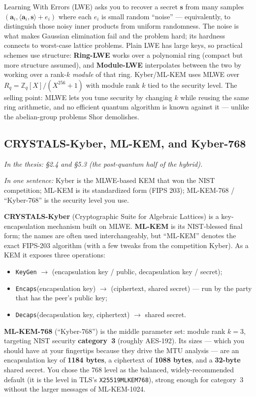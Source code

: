 \documentclass[11pt]{article}
\newcommand{\seethesis}[1]{%
  {\small\color{softgray}\textit{In the thesis: #1}}\par\vspace{3pt}}
\newcommand{\nutshell}[1]{\noindent\textit{In one sentence:} #1\par\vspace{4pt}}
\begin{document}
Learning With Errors (LWE) asks you to recover a secret $\mathbf{s}$ from many
samples $(\mathbf{a}_i, \langle \mathbf{a}_i, \mathbf{s}\rangle + e_i)$ where each
$e_i$ is small random ``noise'' --- equivalently, to distinguish those noisy
inner products from uniform randomness. The noise is what makes Gaussian
elimination fail and the problem hard; its hardness connects to worst-case
lattice problems. Plain LWE has large keys, so practical schemes use structure:
\textbf{Ring-LWE} works over a polynomial ring (compact but more structure
assumed), and \textbf{Module-LWE} interpolates between the two by working over a
rank-$k$ \emph{module} of that ring. Kyber/ML-KEM uses MLWE over
$R_q = \mathbb{Z}_q[X]/(X^{256}+1)$ with module rank $k$ tied to the security
level. The selling point: MLWE lets you tune security by changing $k$ while
reusing the same ring arithmetic, and no efficient quantum algorithm is known
against it --- unlike the abelian-group problems Shor demolishes.

\subsection{CRYSTALS-Kyber, ML-KEM, and Kyber-768}
\seethesis{\S2.4 and \S5.3 (the post-quantum half of the hybrid).}
\nutshell{Kyber is the MLWE-based KEM that won the NIST competition; ML-KEM is
its standardized form (FIPS 203); ML-KEM-768 / ``Kyber-768'' is the security
level you use.}

\textbf{CRYSTALS-Kyber} (Cryptographic Suite for Algebraic Lattices) is a
key-encapsulation mechanism built on MLWE. \textbf{ML-KEM} is its NIST-blessed
final form; the names are often used interchangeably, but ``ML-KEM'' denotes the
exact FIPS-203 algorithm (with a few tweaks from the competition Kyber). As a KEM
it exposes three operations:
\begin{itemize}
  \item \texttt{KeyGen} $\to$ (encapsulation key / public, decapsulation key /
  secret);
  \item \texttt{Encaps}(encapsulation key) $\to$ (ciphertext, shared secret) ---
  run by the party that has the peer's public key;
  \item \texttt{Decaps}(decapsulation key, ciphertext) $\to$ shared secret.
\end{itemize}
\textbf{ML-KEM-768} (``Kyber-768'') is the middle parameter set: module rank
$k=3$, targeting NIST security \textbf{category~3} (roughly AES-192). Its sizes
--- which you should have at your fingertips because they drive the MTU analysis
--- are an encapsulation key of \textbf{1184 bytes}, a ciphertext of
\textbf{1088 bytes}, and a \textbf{32-byte} shared secret. You chose the 768
level as the balanced, widely-recommended default (it is the level in TLS's
\texttt{X25519MLKEM768}), strong enough for category~3 without the larger
messages of ML-KEM-1024.
\end{document}
